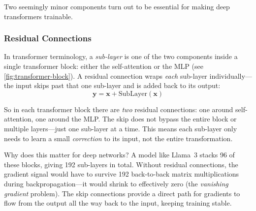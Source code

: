 Two seemingly minor components turn out to be essential for making
deep transformers trainable.

\subsubsection{Residual Connections}

In transformer terminology, a \emph{sub-layer} is one of the two
components inside a single transformer block: either the self-attention
or the MLP (see \cref{fig:transformer-block}). A residual connection
wraps \emph{each} sub-layer individually---the input skips past that
one sub-layer and is added back to its output:
\begin{equation}
  \bm{y} = \bm{x} + \text{SubLayer}(\bm{x})
  \label{eq:residual}
\end{equation}

So in each transformer block there are \emph{two} residual
connections: one around self-attention, one around the MLP. The skip
does not bypass the entire block or multiple layers---just one
sub-layer at a time. This means each sub-layer only needs to learn a
small \emph{correction} to its input, not the entire transformation.

Why does this matter for deep networks? A model like Llama~3 stacks
96 of these blocks, giving 192 sub-layers in total. Without residual
connections, the gradient signal would have to survive 192
back-to-back matrix multiplications during backpropagation---it would
shrink to effectively zero (the \emph{vanishing gradient} problem).
The skip connections provide a direct path for gradients to flow from
the output all the way back to the input, keeping training stable.

